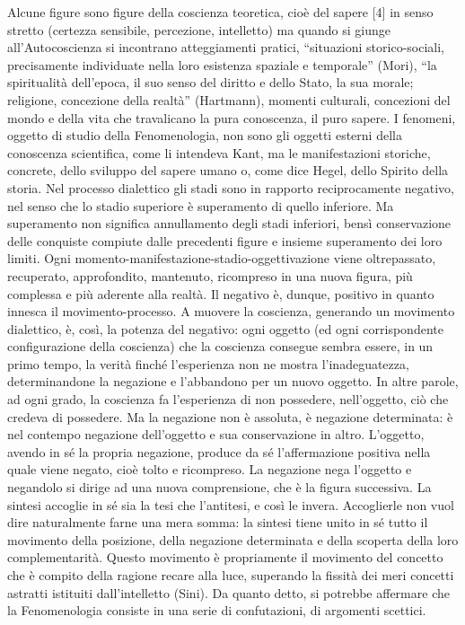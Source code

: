 \documentclass[a4paper,12pt,oneside,openany]{book}%
\begin{document}
Alcune figure sono figure della coscienza teoretica, cioè del sapere [4] in senso stretto (certezza sensibile, percezione, intelletto) ma quando si giunge all’Autocoscienza si incontrano atteggiamenti pratici, “situazioni storico-sociali, precisamente individuate nella loro esistenza spaziale e temporale” (Mori), “la spiritualità dell’epoca, il suo senso del diritto e dello Stato, la sua morale; religione, concezione della realtà” (Hartmann), momenti culturali, concezioni del mondo e della vita che travalicano la pura conoscenza, il puro sapere. I fenomeni, oggetto di studio della Fenomenologia, non sono gli oggetti esterni della conoscenza scientifica, come li intendeva Kant, ma le manifestazioni storiche, concrete, dello sviluppo del sapere umano o, come dice Hegel, dello Spirito della storia. Nel processo dialettico gli stadi sono in rapporto reciprocamente negativo, nel senso che lo stadio superiore è superamento di quello inferiore. Ma superamento non significa annullamento degli stadi inferiori, bensì conservazione delle conquiste compiute dalle precedenti figure e insieme superamento dei loro limiti. Ogni momento-manifestazione-stadio-oggettivazione viene oltrepassato, recuperato, approfondito, mantenuto, ricompreso in una nuova figura, più complessa e più aderente alla realtà. Il negativo è, dunque, positivo in quanto innesca il movimento-processo. A muovere la coscienza, generando un movimento dialettico, è, così, la potenza del negativo: ogni oggetto (ed ogni corrispondente configurazione della coscienza) che la coscienza consegue sembra essere, in un primo tempo, la verità finché l’esperienza non ne mostra l’inadeguatezza, determinandone la negazione e l’abbandono per un nuovo oggetto. In altre parole, ad ogni grado, la coscienza fa l’esperienza di non possedere, nell’oggetto, ciò che credeva di possedere. Ma la negazione non è assoluta, è negazione determinata: è nel contempo negazione dell’oggetto e sua conservazione in altro. L’oggetto, avendo in sé la propria negazione, produce da sé l’affermazione positiva nella quale viene negato, cioè tolto e ricompreso. La negazione nega l’oggetto e negandolo si dirige ad una nuova comprensione, che è la figura successiva. La sintesi accoglie in sé sia la tesi che l’antitesi, e così le invera. Accoglierle non vuol dire naturalmente farne una mera somma: la sintesi tiene unito in sé tutto il movimento della posizione, della negazione determinata e della scoperta della loro complementarità. Questo movimento è propriamente il movimento del concetto che è compito della ragione recare alla luce, superando la fissità dei meri concetti astratti istituiti dall’intelletto (Sini). Da quanto detto, si potrebbe affermare che la Fenomenologia consiste in una serie di confutazioni, di argomenti scettici.
\end{document}
